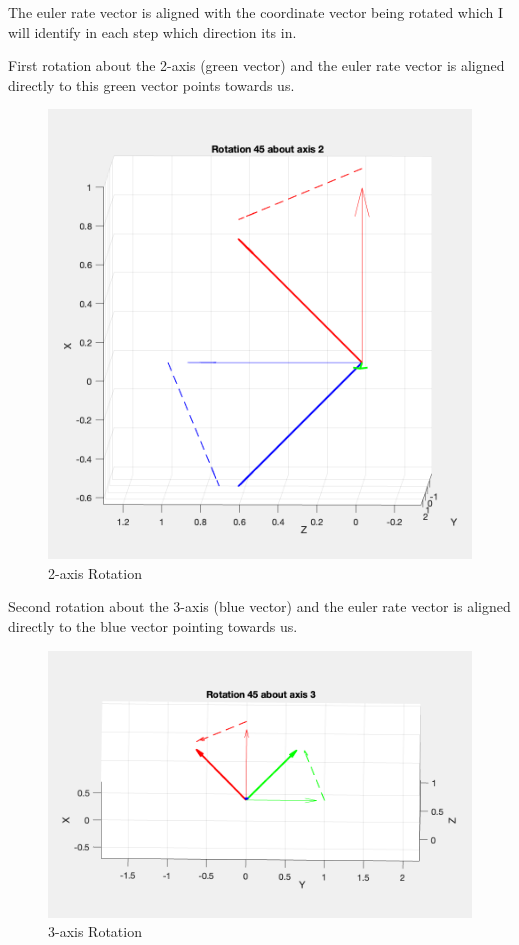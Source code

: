 \documentclass{article}
\begin{document}
The euler rate vector is aligned with the coordinate vector being rotated which I will identify in each step which direction its in.

\newpage
First rotation about the 2-axis (green vector) and the euler rate vector is aligned directly to this green vector points towards us.
\begin{figure}[H]
    \centering
    \includegraphics[width=0.8\linewidth]{2_axis_rotation.png}
    \caption{2-axis Rotation}
\end{figure}

\newpage
Second rotation about the 3-axis (blue vector) and the euler rate vector is aligned directly to the blue vector pointing towards us.
\begin{figure}[H]
    \centering
    \includegraphics[width=0.8\linewidth]{3_axis_rotation.png}
    \caption{3-axis Rotation}
\end{figure}
\end{document}
